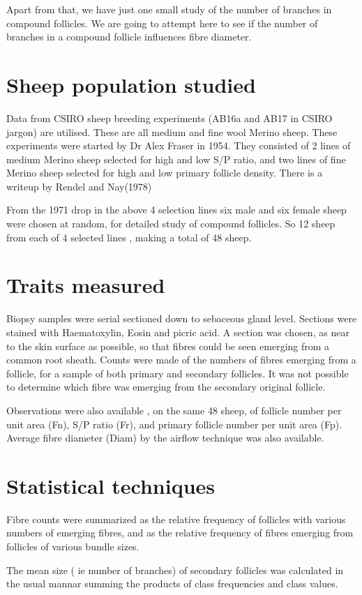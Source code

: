 \documentclass[titlepage]{article}  %
\begin{document}
Apart from that, we have just one small study of the number of branches in compound follicles. We are going to attempt here to see if the number of branches in a compound follicle influences fibre diameter.

\section{ Sheep population studied}
Data from CSIRO sheep breeding experiments (AB16a and AB17 in CSIRO jargon) are utilised.  These are all medium and fine wool Merino sheep. These experiments were started by Dr Alex Fraser in 1954. They consisted of 2 lines of medium Merino sheep selected for high and low S/P ratio, and two lines of fine Merino sheep selected for high and low primary follicle density. There is a writeup by Rendel and Nay(1978)~\cite{rend:78}

From the 1971 drop in the above 4 selection lines six male and six female sheep were chosen at random, for detailed study of compound follicles. So 12 sheep from each of 4 selected lines , making a total of 48 sheep.


\section{Traits measured}
Biopsy samples were serial sectioned down to sebaceous gland level. Sections were stained with Haematoxylin, Eosin and picric acid.  A section was chosen, as near to the skin surface as possible, so that fibres could be seen emerging from a common root sheath.  Counts were made of the numbers of fibres emerging from a follicle, for a sample of both primary and secondary follicles. It was not possible to determine which fibre was emerging from the secondary original follicle.

Observations were also available , on the same 48 sheep, of follicle number per unit area (Fn), S/P ratio (Fr), and primary follicle number per unit area (Fp). Average fibre diameter (Diam) by the airflow technique was also available.


\section{Statistical techniques}
Fibre counts were summarized as the relative frequency of follicles with various numbers of emerging fibres, and as the relative frequency of fibres emerging from follicles of various bundle sizes. 

The mean size ( ie number of branches) of secondary follicles was calculated in the usual mannar summing the products of class frequencies and class values.
\end{document}
